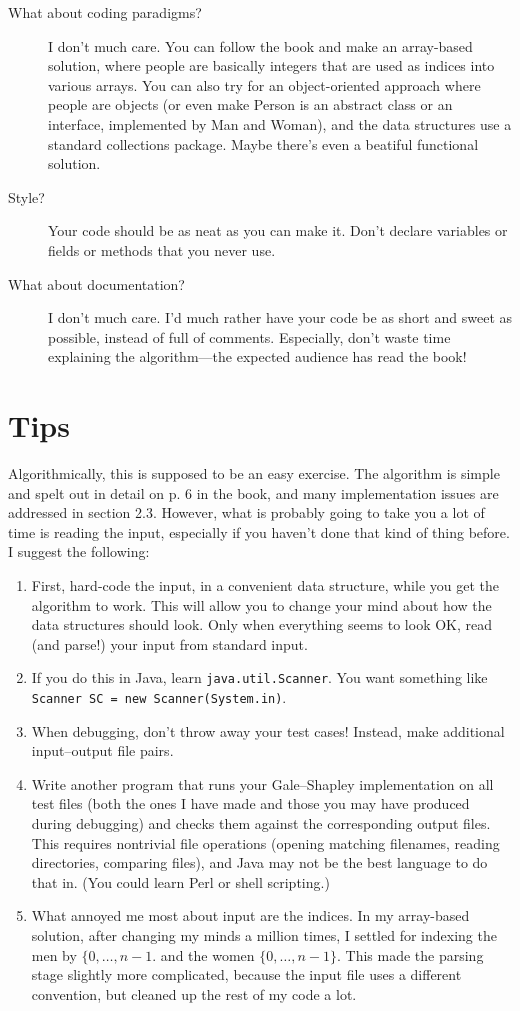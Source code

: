 \documentclass{tufte-handout}
\begin{document}
\begin{description}
  \item[What about coding paradigms?]
    I don’t much care.
    You can follow the book and make an array-based solution, where people are basically integers that are used as indices into various arrays.
    You can also try for an object-oriented approach where people are objects (or even make Person is an abstract class or an interface, implemented by Man and Woman), and the data structures use a standard collections package.
    Maybe there’s even a beatiful functional solution.
  \item[Style?]
    Your code should be as neat as you can make it.
    Don’t declare variables or fields or methods that you never use.
  \item[What about documentation?]
    I don’t much care.
    I’d much rather have your code be as short and sweet as possible, instead of full of comments.
    Especially, don’t waste time explaining the algorithm---the expected audience has read the book!
\end{description}

\section{Tips}

 
Algorithmically, this is supposed to be an easy exercise.
The algorithm is simple and spelt out in detail on p. 6 in the book, and many implementation issues are addressed in section 2.3.
However, what is probably going to take you a lot of time is reading the input, especially if you haven’t done that kind of thing before.
I suggest the following:
\begin{enumerate}
  \item First, hard-code the input, in a convenient data structure, while
you get the algorithm to work.
This will allow you to change your mind about how the data structures should look.
Only when everything seems to look OK, read (and parse!) your input from standard input.
\item If you do this in Java, learn {\tt java.util.Scanner}.
  You want something like {\tt Scanner SC = new Scanner(System.in)}.
\item When debugging, don’t throw away your test cases!
  Instead, make additional input–output file pairs.
\item Write another program that runs your Gale--Shapley implementation on all test files (both the ones I have made and those you may have produced during debugging) and checks them against the corresponding output files.
  This requires nontrivial file operations (opening matching filenames, reading directories, comparing files), and Java may not be the best language to do that in.
  (You could learn Perl or shell scripting.)
\item What annoyed me most about input are the indices.
  In my array-based solution, after changing my minds a million times, I settled for indexing the men by $\{0,\ldots,n-1.$ and the women $\{0,\ldots,n-1\}$.
    This made the parsing stage slightly more complicated, because the input file uses a different convention, but cleaned up the rest of my code a lot.
  \end{enumerate}
\end{document}
